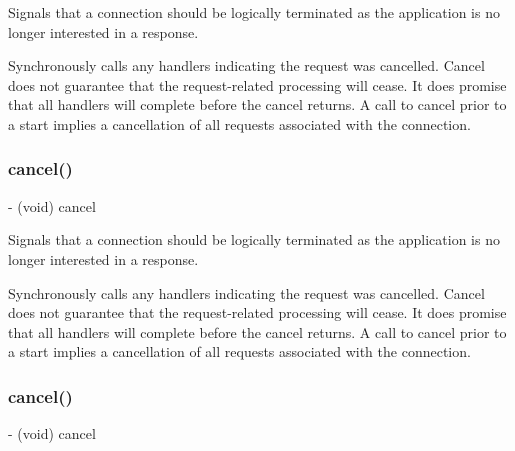 Signals that a connection should be logically terminated as the application is no longer interested in a response.

Synchronously calls any handlers indicating the request was cancelled. Cancel does not guarantee that the request-\/related processing will cease. It does promise that all handlers will complete before the cancel returns. A call to cancel prior to a start implies a cancellation of all requests associated with the connection. \mbox{\label{interfaceFBRequestConnection_aacedf34994dad63d0b6272cfec921889}} 
\subsubsection{\texorpdfstring{cancel()}{cancel()}\hspace{0.1cm}{\footnotesize\ttfamily [2/5]}}
{\footnotesize\ttfamily -\/ (void) cancel \begin{DoxyParamCaption}{ }\end{DoxyParamCaption}}

Signals that a connection should be logically terminated as the application is no longer interested in a response.

Synchronously calls any handlers indicating the request was cancelled. Cancel does not guarantee that the request-\/related processing will cease. It does promise that all handlers will complete before the cancel returns. A call to cancel prior to a start implies a cancellation of all requests associated with the connection. \mbox{\label{interfaceFBRequestConnection_aacedf34994dad63d0b6272cfec921889}} 
\subsubsection{\texorpdfstring{cancel()}{cancel()}\hspace{0.1cm}{\footnotesize\ttfamily [3/5]}}
{\footnotesize\ttfamily -\/ (void) cancel \begin{DoxyParamCaption}{ }\end{DoxyParamCaption}}

